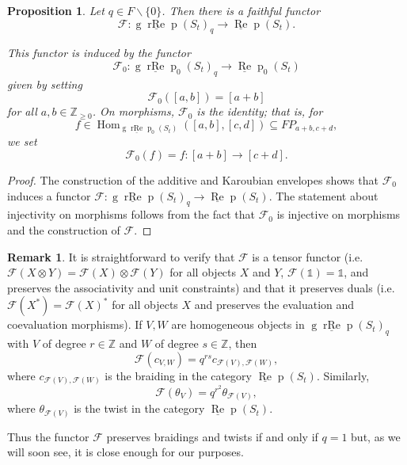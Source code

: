 \documentclass[12pt, reqno]{amsart}
\newtheorem{proposition}[theorem]{Proposition}
\theoremstyle{definition}
\newtheorem{remark}[theorem]{Remark}
\newcommand{\Hom}{\operatorname{Hom}}
\def\uRep{\underline{\operatorname{Re}}\!\operatorname{p}}
\newcommand{\F}{\mathcal{F}}
\renewcommand{\1}{_{(1)}}
\renewcommand{\2}{_{(2)}}
\newcommand{\3}{_{(3)}}
\newcommand{\4}{_{(4)}}
\newcommand{\Z}{\mathbb{Z}}
\def\gruRep{\operatorname{g}\!\underline{\operatorname{rRe}}\!\operatorname{p}}
\newcommand{\unit}{\ensuremath{\mathds{1}}}
\begin{document}
\begin{proposition}\label{P:RelatingCats} Let $q \in  F \backslash \{0 \}$.
 Then there is a faithful functor 
\[
\F: \gruRep(S_{t})_{q} \to \uRep(S_{t}).
\] 


This functor is induced by the functor
\[
\F_{0}: \gruRep_{0}(S_{t})_{q} \to \uRep_{0}(S_{t})
\] given by setting
\[
\F_{0}([a,b])=[a+b]
\]
for all $a,b \in \Z_{\geq 0}$.  On morphisms, $\F_{0}$ is the identity; that is, for 
\[
f \in \Hom_{\gruRep_{0}(S_{t})}([a,b], [c,d]) \subseteq FP_{a+b,c+d},
\]
we set 
\[
\F_{0}(f) = f: [a+b] \to [c+d].
\] 

\end{proposition}

\begin{proof} The construction of the additive and Karoubian envelopes shows that $\F_{0}$ induces a functor $\F:\gruRep(S_{t})_{q} \to \uRep(S_{t})$. The statement about injectivity on morphisms follows from the fact that $\F_{0}$ is injective on morphisms and the construction of $\F$.
\end{proof}

\begin{remark}\label{R:degrading}  It is straightforward to verify that $\F$ is a tensor functor (i.e.\ $\F(X \otimes Y) = \F(X) \otimes \F(Y)$ for all objects $X$ and $Y$, $\F(\unit ) = \unit$, and preserves the associativity and unit constraints) and that it preserves duals (i.e.\ $\F(X^{*})=\F(X)^{*}$ for all objects $X$ and preserves the evaluation and coevaluation morphisms).  If $V,W$ are homogeneous objects in $\gruRep(S_{t})_{q}$ with $V$ of degree $r \in \Z$ and $W$ of degree $s \in \Z$, then 
\[
\F(c_{V,W}) = q^{r  s} c_{\F(V), \F(W)},
\] where $c_{\F(V), \F(W)}$ is the braiding in the category $\uRep(S_{t})$.  Similarly,
\[
\F(\theta_{V}) = q^{r^{2}}\theta_{\F(V)},
\] where $\theta_{\F(V)}$ is the twist in the category $\uRep(S_{t})$.

Thus the functor $\F$ preserves braidings and twists if and only if $q=1$ but, as we will soon see, it is close enough for our purposes.
\end{remark}
\end{document}
